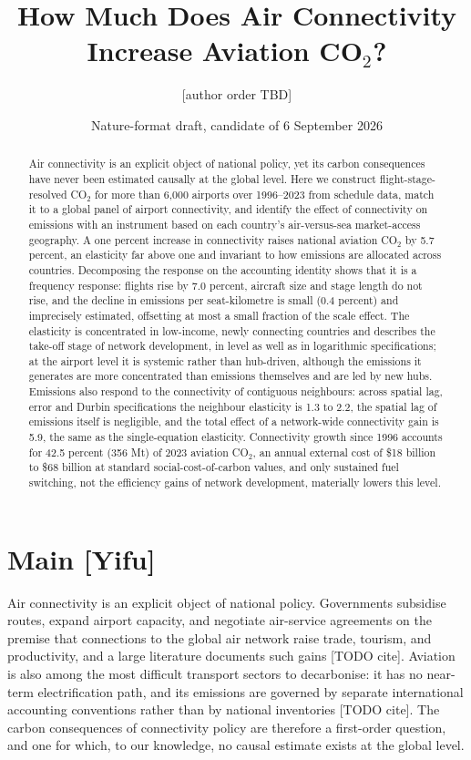 \documentclass[12pt]{article}
\title{How Much Does Air Connectivity Increase Aviation CO$_2$?}
\author{[author order TBD]}
\date{Nature-format draft, candidate of 6 September 2026}
\begin{document}
\maketitle

\begin{abstract}
\noindent Air connectivity is an explicit object of national policy, yet its
carbon consequences have never been estimated causally at the global level.
Here we construct flight-stage-resolved CO$_2$ for more than 6{,}000
airports over 1996--2023 from schedule data, match it to a global panel of
airport connectivity, and identify the effect of connectivity on emissions
with an instrument based on each country's air-versus-sea market-access
geography. A one percent increase in connectivity raises national aviation
CO$_2$ by 5.7 percent, an elasticity far above one and invariant to how
emissions are allocated across countries. Decomposing the response on the
accounting identity shows that it is a frequency response: flights rise by
7.0 percent, aircraft size and stage length do not rise, and the decline in
emissions per seat-kilometre is small (0.4 percent) and imprecisely
estimated, offsetting at most a small fraction of the scale effect. 
The elasticity is concentrated in low-income, newly connecting
countries and describes the take-off stage of network development, in
level as well as in logarithmic specifications; at the airport level it is systemic rather than hub-driven,
although the emissions it generates are more concentrated than emissions
themselves and are led by new hubs. Emissions also respond to the
connectivity of contiguous neighbours: across spatial lag, error and Durbin
specifications the neighbour elasticity is 1.3 to 2.2, the spatial lag of
emissions itself is negligible, and the total effect of a network-wide
connectivity gain is 5.9, the same as the single-equation elasticity. Connectivity growth since
1996 accounts for 42.5 percent (356 Mt) of 2023 aviation CO$_2$, an annual
external cost of \$18 billion to \$68 billion at standard social-cost-of-carbon
values, and only sustained fuel switching, not the efficiency gains of
network development, materially lowers this level.
\end{abstract}

\section*{Main [Yifu]}
Air connectivity is an explicit object of national policy. Governments
subsidise routes, expand airport capacity, and negotiate air-service
agreements on the premise that connections to the global air network raise
trade, tourism, and productivity, and a large literature documents such
gains [TODO cite]. Aviation is also among the most difficult transport
sectors to decarbonise: it has no near-term electrification path, and its
emissions are governed by separate international accounting conventions
rather than by national inventories [TODO cite]. The carbon consequences of
connectivity policy are therefore a first-order question, and one for
which, to our knowledge, no causal estimate exists at the global level.
\end{document}
